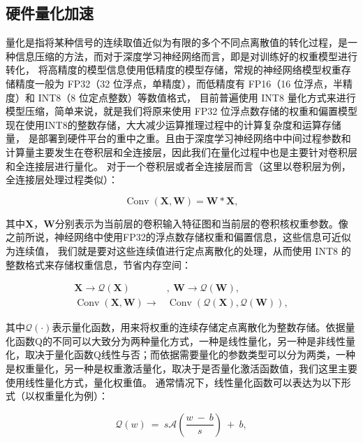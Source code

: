 \subsection{硬件量化加速}
量化是指将某种信号的连续取值近似为有限的多个不同点离散值的转化过程，是一种信息压缩的方法，而对于深度学习神经网络而言，即是对训练好的权重模型进行转化，
将高精度的模型信息使用低精度的模型存储，常规的神经网络模型权重存储精度一般为 FP32（32 位浮点，单精度），而低精度有 FP16（16 位浮点，半精度）和 INT8（8 位定点整数）等数值格式，
目前普遍使用 INT8 量化方式来进行模型压缩，简单来说，就是我们将原来使用 FP32 位浮点数存储的权重和偏置模型现在使用INT8的整数存储，大大减少运算推理过程中的计算复杂度和运算存储量，
是部署到硬件平台的重中之重。且由于深度学习神经网络中中间过程参数和计算量主要发生在卷积层和全连接层，因此我们在量化过程中也是主要针对卷积层和全连接层进行量化。
对于一个卷积层或者全连接层而言（这里以卷积层为例，全连接层处理过程类似）：

\begin{equation}
	\operatorname{Conv}\left(\bm{X},\bm{W}\right)=\bm{W}\ast\bm{X},
\end{equation}

其中$\bm{X}$，$\bm{W}$分别表示为当前层的卷积输入特征图和当前层的卷积核权重参数。像之前所说，神经网络中使用FP32的浮点数存储权重和偏置信息，这些信息可近似为连续值，
我们就是要对这些连续值进行定点离散化的处理，从而使用 INT8 的整数格式来存储权重信息，节省内存空间：

\begin{equation}
	\begin{aligned}
	\bm{X}\rightarrow\mathcal{Q}\left(\bm{X}\right)&,\ \bm{W}\rightarrow\mathcal{Q}\left(\bm{W}\right),  \\
	\operatorname{Conv}\left(\bm{X},\bm{W}\right)\rightarrow&\operatorname{Conv}\left(\mathcal{Q}\left(\bm{X}\right),\mathcal{Q}\left(\bm{W}\right)\right),
	\end{aligned}
\end{equation}

其中$\mathcal{Q}\left(\cdot\right)$表示量化函数，用来将权重的连续存储定点离散化为整数存储。依据量化函数Q的不同可以大致分为两种量化方式，一种是线性量化，另一种是非线性量化，取决于量化函数Q线性与否；而依据需要量化的参数类型可以分为两类，一种是权重量化，另一种是权重激活量化，取决于是否量化激活函数值，我们这里主要使用线性量化方式，量化权重值。
通常情况下，线性量化函数可以表达为以下形式（以权重量化为例）：

\begin{equation}
	\mathcal{Q}(w)\ =\ s\mathcal{A}(\frac{w\ -\ b}{s})\ +\ b,
\end{equation}

